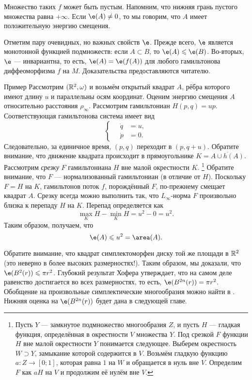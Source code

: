 Множество таких $f$ может быть пустым.
Напомним, что нижняя грань пустого множества равна $+\infty$.
Если $\e (A) \ne 0$, то мы говорим, что $A$ имеет положительную энергию смещения.

Отметим пару очевидных, но важных свойств $\e$.
Прежде всего, $\e$ является монотонной функцией подмножеств: если $A \subset B$, то $\e(A) \le \e(B)$.
Во-вторых, $\e$ — инвариантна, то есть, $\e(A) = \e(f(A))$ для любого гамильтонова диффеоморфизма $f$ на $M$.
Доказательства предоставляются читателю.

\begin{ex*}{Пример}
Рассмотрим $(\mathbb{R}^2, \omega)$ и возьмём открытый квадрат $A$, рёбра которого имеют длину $u$ и параллельны осям координат.
Оценим энергию смещения $A$ относительно расстояния $\rho_\infty$.
Рассмотрим гамильтониан $H (p, q) = up$.
Соответствующая гамильтонова система имеет вид 
\[
\begin{cases}
\quad\dot q &= u,
\\
\quad\dot p &= 0.
\end{cases}
\]
Следовательно, за единичное время, $(p, q)$ переходит в $(p, q + u)$.
Обратите внимание, что движение квадрата происходит в прямоугольнике $K = \overline{A \cup h (A)}$.
Рассмотрим \emph{срезку} $F$ гамильтониана $H$ вне малой окрестности $K$.%
\footnote{Пусть $Y$ — замкнутое подмножество многообразия $Z$, и пусть $H$ — гладкая функция, определённая в окрестности $V$ множества $Y$.
Под срезкой $F$ функции $H$ вне малой окрестности $Y$ понимается следующее.
Выберем окрестность $W\supset Y$, замыкание которой содержится в $V$.
Возьмём гладкую функцию $a\colon Z \to [0; 1]$, которая равна $1$ на $W$ и обращается в нуль вне $V$.
Определим $F$ как $aH$ на $V$ и продолжим её нулём вне $V$.}
Обратите внимание, что $F$ — нормализованный гамильтониан (в отличие от $H$).
Поскольку $F = H$ на $K$, гамильтонов поток $f$, порождённый $F$, по-прежнему смещает квадрат $A$.
Срезку всегда можно выполнить так, что $L_\infty$-норма $F$ произвольно близка к перепаду $H$ на $K$.
Перепад определяется как 
\[\max_K H - \min_K H = u^2 - 0 = u^2.\]
Таким образом, получаем, что 
\[\e (A) \le u^2 = \area (A).\]
\end{ex*}

Обратите внимание, что квадрат симплектоморфен диску той же площади в $\mathbb{R}^2$ (это неверно в более высоких размерностях!).
Таким образом, мы доказали, что $\e (B^2 (r)) \le \pi r^2$.
Глубокий результат Хофера \cite{H1} утверждает, что на самом деле равенство
достигается во всех размерностях, то есть, $\e (B^{2n} (r)) = \pi r^2$.
Обобщение на произвольные симплектические многообразия можно найти в \cite{LM1}.
Нижняя оценка на $\e(B^{2n} (r))$ будет дана в следующей главе.

